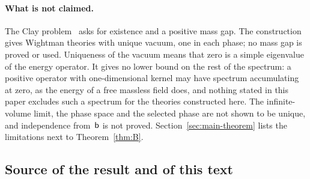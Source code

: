 \paragraph{What is not claimed.}
The Clay problem~\cite[\S4]{JaffeWitten2006} asks for existence and a positive mass gap. The construction gives Wightman theories with unique vacuum, one in each phase; no mass gap is proved or used. Uniqueness of the vacuum means that zero is a simple eigenvalue of the energy operator. It gives no lower bound on the rest of the spectrum: a positive operator with one-dimensional kernel may have spectrum accumulating at zero, as the energy of a free massless field does, and nothing stated in this paper excludes such a spectrum for the theories constructed here. The infinite-volume limit, the phase space and the selected phase are not shown to be unique, and independence from~$\mathsf{b}$ is not proved. Section~\ref{sec:main-theorem} lists the limitations next to Theorem~\ref{thm:B}.

\subsection{Source of the result and of this text}\label{sec:intro-source}


